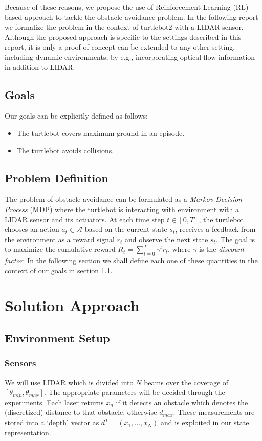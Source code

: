 \documentclass{article}
\begin{document}
Because of these reasons, we propose the use of Reinforcement Learning (RL) based approach to tackle the obstacle avoidance problem. In the following report we formalize the problem in the context of turtlebot2 with a LIDAR sensor. Although the proposed approach is specific to the settings described in this report, it is only a proof-of-concept can be extended to any other setting, including dynamic environments, by e.g., incorporating optical-flow information in addition to LIDAR.

\subsection{Goals}
Our goals can be explicitly defined as follows:
\begin{itemize}
\item The turtlebot covers maximum ground in an episode.
\item The turtlebot avoids collisions.
\end{itemize}
\subsection{Problem Definition}
The problem of obstacle avoidance can be formulated as a {\it Markov Decision Process} (MDP) where the turtlebot is interacting with environment with a LIDAR sensor and its actuators. At each time step $t \in [0, T]$, the turtlebot chooses an action $a_t \in \mathcal{A}$ based on the current state $s_t$, receives a feedback from the environment as a reward signal $r_t$ and observe the next state $s_t$. The goal is to maximize the cumulative reward $R_t = \sum_{t=0}^{T}\gamma^{t}r_{t}$, where $\gamma$ is the {\it discount factor}. In the following section we shall define each one of these quantities in the context of our goals in section 1.1.

\section{Solution Approach}

\subsection{Environment Setup}
\subsubsection{Sensors}
We will use LIDAR which is divided into $N$ beams over the coverage of $[\theta_{min}, \theta_{max}]$. The appropriate parameters will be decided through the experiments. Each laser returns $x_n$ if it detects an obstacle which denotes the (discretized) distance to that obstacle, otherwise $d_{max}$. These measurements are stored into a `depth' vector as $d^T = (x_1,...,x_N)$ and is exploited in our state representation.
\end{document}
